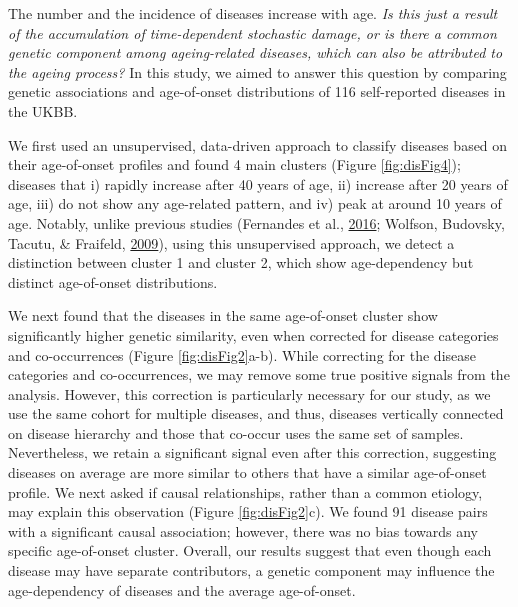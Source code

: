 \documentclass[12pt,twoside]{unicam}
\begin{document}
The number and the incidence of diseases increase with age. \emph{Is this just a result of the accumulation of time-dependent stochastic damage, or is there a common genetic component among ageing-related diseases, which can also be attributed to the ageing process?} In this study, we aimed to answer this question by comparing genetic associations and age-of-onset distributions of 116 self-reported diseases in the UKBB.

We first used an unsupervised, data-driven approach to classify diseases based on their age-of-onset profiles and found 4 main clusters (Figure \ref{fig:disFig4}); diseases that i) rapidly increase after 40 years of age, ii) increase after 20 years of age, iii) do not show any age-related pattern, and iv) peak at around 10 years of age. Notably, unlike previous studies (Fernandes et al., \protect\hyperlink{ref-Fernandes2016}{2016}; Wolfson, Budovsky, Tacutu, \& Fraifeld, \protect\hyperlink{ref-Wolfson2009}{2009}), using this unsupervised approach, we detect a distinction between cluster 1 and cluster 2, which show age-dependency but distinct age-of-onset distributions.

We next found that the diseases in the same age-of-onset cluster show significantly higher genetic similarity, even when corrected for disease categories and co-occurrences (Figure \ref{fig:disFig2}a-b). While correcting for the disease categories and co-occurrences, we may remove some true positive signals from the analysis. However, this correction is particularly necessary for our study, as we use the same cohort for multiple diseases, and thus, diseases vertically connected on disease hierarchy and those that co-occur uses the same set of samples. Nevertheless, we retain a significant signal even after this correction, suggesting diseases on average are more similar to others that have a similar age-of-onset profile. We next asked if causal relationships, rather than a common etiology, may explain this observation (Figure \ref{fig:disFig2}c). We found 91 disease pairs with a significant causal association; however, there was no bias towards any specific age-of-onset cluster. Overall, our results suggest that even though each disease may have separate contributors, a genetic component may influence the age-dependency of diseases and the average age-of-onset.
\end{document}
